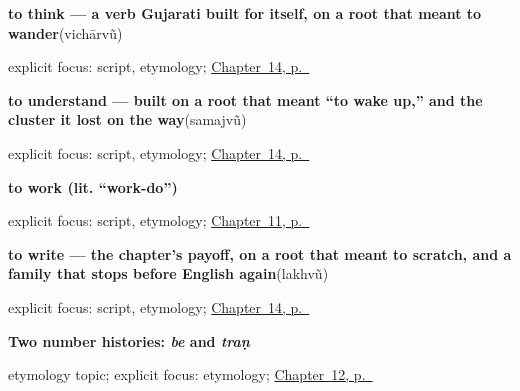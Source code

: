 \noindent\begin{minipage}[t]{\linewidth}
\raggedright
\textbf{to think — a verb Gujarati built for itself, on a root that meant to wander}\enspace\emph{}\enspace(vichārvũ)\par
\footnotesize explicit focus: script, etymology; \hyperref[ch:gu-mind-and-page]{Chapter~14, p.~\pageref*{ch:gu-mind-and-page}}
\end{minipage}\par\smallskip

\noindent\begin{minipage}[t]{\linewidth}
\raggedright
\textbf{to understand — built on a root that meant \textquotedblleft{}to wake up,\textquotedblright{} and the cluster it lost on the way}\enspace\emph{}\enspace(samajvũ)\par
\footnotesize explicit focus: script, etymology; \hyperref[ch:gu-mind-and-page]{Chapter~14, p.~\pageref*{ch:gu-mind-and-page}}
\end{minipage}\par\smallskip

\noindent\begin{minipage}[t]{\linewidth}
\raggedright
\textbf{to work (lit. \textquotedblleft{}work-do\textquotedblright{})}\enspace\emph{ }\par
\footnotesize explicit focus: script, etymology; \hyperref[ch:first-verbs]{Chapter~11, p.~\pageref*{ch:first-verbs}}
\end{minipage}\par\smallskip

\noindent\begin{minipage}[t]{\linewidth}
\raggedright
\textbf{to write — the chapter's payoff, on a root that meant to scratch, and a family that stops before English again}\enspace\emph{}\enspace(lakhvũ)\par
\footnotesize explicit focus: script, etymology; \hyperref[ch:gu-mind-and-page]{Chapter~14, p.~\pageref*{ch:gu-mind-and-page}}
\end{minipage}\par\smallskip

\noindent\begin{minipage}[t]{\linewidth}
\raggedright
\textbf{Two number histories: \emph{be} and \emph{traṇ}}\par
\footnotesize etymology topic; explicit focus: etymology; \hyperref[ch:numbers-one-to-five]{Chapter~12, p.~\pageref*{ch:numbers-one-to-five}}
\end{minipage}\par\smallskip


